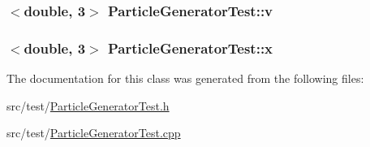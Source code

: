\hypertarget{classParticleGeneratorTest_a5268544a0e8f86fa20de989cda122542}{
\subsubsection[{v}]{$<$double, 3$>$ Particle\+Generator\+Test\+::v\hspace{0.3cm}{\ttfamily [private]}}}\label{classParticleGeneratorTest_a5268544a0e8f86fa20de989cda122542}
\hypertarget{classParticleGeneratorTest_abc0fcd9dd33eb061b6a97a91c5110a61}{
\subsubsection[{x}]{$<$double, 3$>$ Particle\+Generator\+Test\+::x\hspace{0.3cm}{\ttfamily [private]}}}\label{classParticleGeneratorTest_abc0fcd9dd33eb061b6a97a91c5110a61}


The documentation for this class was generated from the following files\+:\begin{DoxyCompactItemize}
\item 
src/test/\hyperlink{ParticleGeneratorTest_8h}{Particle\+Generator\+Test.\+h}\item 
src/test/\hyperlink{ParticleGeneratorTest_8cpp}{Particle\+Generator\+Test.\+cpp}\end{DoxyCompactItemize}
